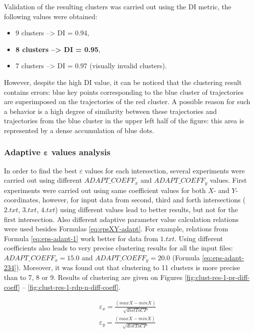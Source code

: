 Validation of the resulting clusters was carried out using the DI metric, the following values ​​were obtained:

\begin{itemize}
	\setlength\itemsep{0em}
	\item 9 clusters --> DI = 0.94,
	\item \textbf{8 clusters --> DI = 0.95},
	\item 7 clusters --> DI = 0.97 (visually invalid clusters).
\end{itemize}

However, despite the high DI value, it can be noticed that the clustering result contains errors: blue key points corresponding to the blue cluster of trajectories are superimposed on the trajectories of the red cluster. A possible reason for such a behavior is a high degree of similarity between these trajectories and trajectories from the blue cluster in the upper left half of the figure: this area is represented by a dense accumulation of blue dots.

\subsubsection{Adaptive $\bm{\varepsilon}$ values analysis}

In order to find the best $\varepsilon$ values for each intersection, several experiments were carried out using different $ADAPT\_COEFF_x$ and $ADAPT\_COEFF_y$ values. First experiments were carried out using same coefficient values for both $X$- and $Y$-coordinates, however, for input data from second, third and forth intersections ($2.txt$, $3.txt$, $4.txt$) using different values lead to better results, but not for the first intersection. Also different adaptive parameter value calculation relations were used besides Formulas \ref{eq:epsXY-adapt}. For example, relations from Formula \ref{eq:eps-adapt-1} work better for data from $1.txt$. Using different coefficients also leads to very precise clustering results for all the input files: $ADAPT\_COEFF_x = 15.0$ and $ADAPT\_COEFF_y = 20.0$ (Formula \ref{eq:eps-adapt-234}). Moreover, it was found out that clustering to 11 clusters is more precise than to 7, 8 or 9. Results of clustering are given on Figures \ref{fig:clust-res-1-pr-diff-coeff} -- \ref{fig:clust-res-1-rdp-n-diff-coeff}.

\begin{subequations}\label{eq:eps-adapt-1}
	\begin{align}
		\varepsilon_x = \frac{(maxX - minX)}{\sqrt{distToCP}} \\
		\varepsilon_y = \frac{(maxX - minX)}{\sqrt{distToCP}}
	\end{align}
\end{subequations}


